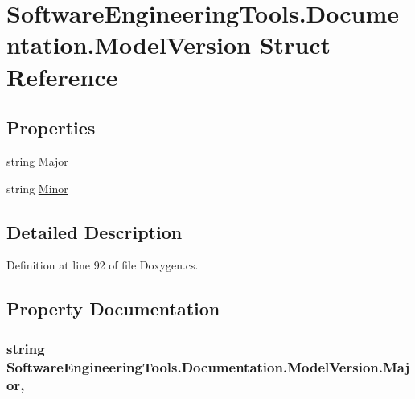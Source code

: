 \hypertarget{struct_software_engineering_tools_1_1_documentation_1_1_model_version}{\section{Software\+Engineering\+Tools.\+Documentation.\+Model\+Version Struct Reference}
\label{struct_software_engineering_tools_1_1_documentation_1_1_model_version}
}
\subsection*{Properties}
\begin{DoxyCompactItemize}
\item 
string \hyperlink{struct_software_engineering_tools_1_1_documentation_1_1_model_version_a65b4bcf1be26c008edb498b288c2bc80}{Major}
\item 
string \hyperlink{struct_software_engineering_tools_1_1_documentation_1_1_model_version_a7dd1df3f1dba46b7f459e9b3fc64e65c}{Minor}
\end{DoxyCompactItemize}


\subsection{Detailed Description}


Definition at line 92 of file Doxygen.\+cs.



\subsection{Property Documentation}
\hypertarget{struct_software_engineering_tools_1_1_documentation_1_1_model_version_a65b4bcf1be26c008edb498b288c2bc80}{
\subsubsection[{Major}]{\setlength{\rightskip}{0pt plus 5cm}string Software\+Engineering\+Tools.\+Documentation.\+Model\+Version.\+Major\hspace{0.3cm}{\ttfamily [get]}, {\ttfamily [set]}}}\label{struct_software_engineering_tools_1_1_documentation_1_1_model_version_a65b4bcf1be26c008edb498b288c2bc80}


